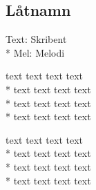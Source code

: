 

\pagestyle{Example Kaptiel}


\begin{SongText}
\subsection{\textbf{Låtnamn}}
\begin{SongInfo}
Text: Skribent\\*%
Mel: Melodi
\end{SongInfo}
\begin{Verse}
text text text text\\*%
text text text text\\*%
text text text text\\*%
text text text text
\end{Verse}
\begin{Verse}
text text text text\\*%
text text text text\\*%
text text text text\\*%
text text text text 
\end{Verse}
\end{SongText}
\newpage